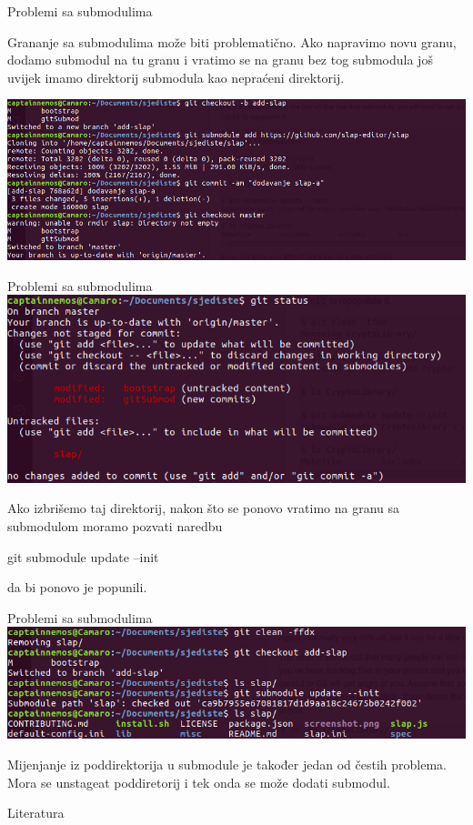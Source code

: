 \documentclass[10pt]{beamer}
\begin{document}
\begin{frame}[fragile]{Problemi sa submodulima}
    
    Grananje sa submodulima može biti problematično.
    Ako napravimo novu granu, dodamo submodul na tu granu i vratimo se na granu bez tog submodula još uvijek imamo direktorij submodula kao nepraćeni direktorij.
    
    \includegraphics[scale=0.3]{sub_removing_sub1}
\end{frame}

\begin{frame}[fragile]{Problemi sa submodulima}
    \includegraphics[scale=0.34]{sub_removing_sub2}
    
    Ako izbrišemo taj direktorij, nakon što se ponovo vratimo na granu sa submodulom moramo pozvati naredbu
    \begin{semiverbatim}git submodule update --init\end{semiverbatim}
    da bi ponovo je popunili.

\end{frame}

\begin{frame}[fragile]{Problemi sa submodulima}
    \includegraphics[scale=0.4]{sub_removing_sub3}
    
    Mijenjanje iz poddirektorija u submodule je također jedan od čestih problema.
    Mora se unstageat poddiretorij i tek onda se može dodati submodul.
    
\end{frame}

\begin{frame}[fragile]{Literatura}
	
  	
\end{frame}
\end{document}
